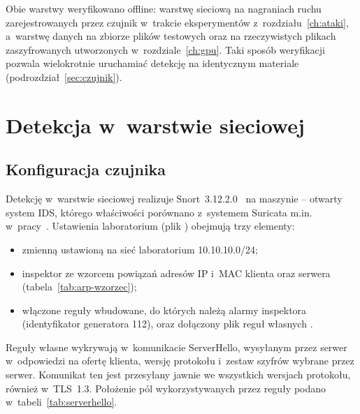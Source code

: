 Obie warstwy weryfikowano offline: warstwę sieciową na nagraniach ruchu zarejestrowanych przez czujnik w~trakcie eksperymentów z~rozdziału~\ref{ch:ataki}, a~warstwę danych na zbiorze plików testowych oraz na rzeczywistych plikach zaszyfrowanych utworzonych w~rozdziale~\ref{ch:gpu}. Taki sposób weryfikacji pozwala wielokrotnie uruchamiać detekcję na identycznym materiale (podrozdział~\ref{sec:czujnik}).

\section{Detekcja w~warstwie sieciowej}\label{sec:ids}

\subsection*{Konfiguracja czujnika}

Detekcję w~warstwie sieciowej realizuje Snort~3.12.2.0~\cite{snort3} na maszynie  -- otwarty system IDS, którego właściwości porównano z~systemem Suricata m.in. w~pracy~\cite{boukebous2023}. Ustawienia laboratorium (plik ) obejmują trzy elementy:
\begin{itemize}
  \item zmienną  ustawioną na sieć laboratorium 10.10.10.0/24;
  \item inspektor  ze wzorcem powiązań adresów IP i~MAC klienta oraz serwera (tabela~\ref{tab:arp-wzorzec});
  \item włączone reguły wbudowane, do których należą alarmy inspektora  (identyfikator generatora 112), oraz dołączony plik reguł własnych .
\end{itemize}

Reguły własne wykrywają w~komunikacie ServerHello, wysyłanym przez serwer w~odpowiedzi na ofertę klienta, wersję protokołu i~zestaw szyfrów wybrane przez serwer. Komunikat ten jest przesyłany jawnie we wszystkich wersjach protokołu, również w~TLS~1.3. Położenie pól wykorzystywanych przez reguły podano w~tabeli~\ref{tab:serverhello}.

